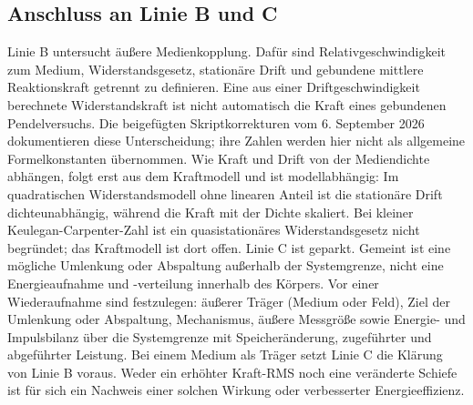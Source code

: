 \documentclass[11pt,a4paper]{article}
\begin{document}
\subsection{Anschluss an Linie B und C}
Linie B untersucht äußere Medienkopplung. Dafür sind Relativgeschwindigkeit zum Medium, Widerstandsgesetz, stationäre Drift und gebundene mittlere Reaktionskraft getrennt zu definieren. Eine aus einer Driftgeschwindigkeit berechnete Widerstandskraft ist nicht automatisch die Kraft eines gebundenen Pendelversuchs. Die beigefügten Skriptkorrekturen vom 6. September 2026 dokumentieren diese Unterscheidung; ihre Zahlen werden hier nicht als allgemeine Formelkonstanten übernommen.
Wie Kraft und Drift von der Mediendichte abhängen, folgt erst aus dem Kraftmodell und ist modellabhängig: Im quadratischen Widerstandsmodell ohne linearen Anteil ist die stationäre Drift dichteunabhängig, während die Kraft mit der Dichte skaliert. Bei kleiner Keulegan-Carpenter-Zahl ist ein quasistationäres Widerstandsgesetz nicht begründet; das Kraftmodell ist dort offen.
Linie C ist geparkt. Gemeint ist eine mögliche Umlenkung oder Abspaltung außerhalb der Systemgrenze, nicht eine Energieaufnahme und -verteilung innerhalb des Körpers. Vor einer Wiederaufnahme sind festzulegen: äußerer Träger (Medium oder Feld), Ziel der Umlenkung oder Abspaltung, Mechanismus, äußere Messgröße sowie Energie- und Impulsbilanz über die Systemgrenze mit Speicheränderung, zugeführter und abgeführter Leistung. Bei einem Medium als Träger setzt Linie C die Klärung von Linie B voraus. Weder ein erhöhter Kraft-RMS noch eine veränderte Schiefe ist für sich ein Nachweis einer solchen Wirkung oder verbesserter Energieeffizienz.
\end{document}
